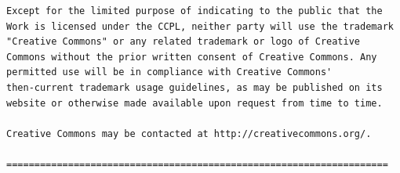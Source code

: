 \begin{verbatim}
Except for the limited purpose of indicating to the public that the
Work is licensed under the CCPL, neither party will use the trademark
"Creative Commons" or any related trademark or logo of Creative
Commons without the prior written consent of Creative Commons. Any
permitted use will be in compliance with Creative Commons'
then-current trademark usage guidelines, as may be published on its
website or otherwise made available upon request from time to time.

Creative Commons may be contacted at http://creativecommons.org/.

====================================================================
\end{verbatim}

